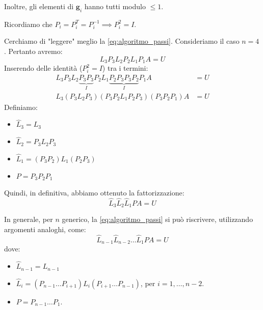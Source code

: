 Inoltre, gli elementi di $\mathbf{g}_i$ hanno tutti modulo $\le 1$.

Ricordiamo che $P_i = P_i^T = P_i^{-1} \implies P_i^2 = I$.

Cerchiamo di "leggere" meglio la \eqref{eq:algoritmo_passi}.
Consideriamo il caso $n=4$. Pertanto avremo:
$$ L_3 P_3 L_2 P_2 L_1 P_1 A = U $$
Inserendo delle identità ($P_i^2=I$) tra i termini:
\begin{align*}
    L_3 P_3 L_2 \underbrace{P_3 P_3}_{I} P_2 L_1 \underbrace{P_2 P_3 P_3 P_2}_{I} P_1 A &= U \\
    L_3 (P_3 L_2 P_3) (P_3 P_2 L_1 P_2 P_3) (P_3 P_2 P_1) A &= U
\end{align*}
Definiamo:
\begin{itemize}
    \item $\hat{L}_3 = L_3$
    \item $\hat{L}_2 = P_3 L_2 P_3$
    \item $\hat{L}_1 = (P_3 P_2) L_1 (P_2 P_3)$
    \item $P = P_3 P_2 P_1$
\end{itemize}
Quindi, in definitiva, abbiamo ottenuto la fattorizzazione:
$$ \hat{L}_3 \hat{L}_2 \hat{L}_1 P A = U $$

In generale, per $n$ generico, la \eqref{eq:algoritmo_passi} si può riscrivere, utilizzando argomenti analoghi, come:
\begin{equation} \label{eq:fattorizzazione_generale}
    \hat{L}_{n-1} \hat{L}_{n-2} \dots \hat{L}_1 P A = U
\end{equation}
dove:
\begin{itemize}
    \item $\hat{L}_{n-1} = L_{n-1}$
    \item $\hat{L}_i = (P_{n-1} \dots P_{i+1}) L_i (P_{i+1} \dots P_{n-1})$, per $i=1, \dots, n-2$.
    \item $P = P_{n-1} \dots P_1$.
\end{itemize}

